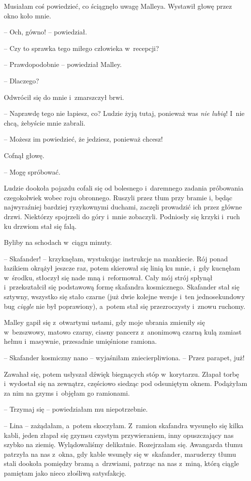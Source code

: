 \documentclass[oneside,polish,11pt,sfheadings]{mwbk}
\begin{document}
Musiałam coś powiedzieć, co ściągnęło uwagę Malleya. Wystawił głowę
przez okno koło mnie.

-- Och, gówno! -- powiedział.

-- Czy to sprawka tego miłego człowieka w~recepcji?

-- Prawdopodobnie -- powiedział Malley.

-- Dlaczego?

Odwrócił się do mnie i~zmarszczył brwi. 

-- Naprawdę tego nie łapiesz, co?
Ludzie żyją tutaj, ponieważ was \textit{nie lubią}! I~nie chcą, żebyście
mnie zabrali.

-- Możesz im powiedzieć, że jedziesz, ponieważ chcesz!

Cofnął głowę. 

-- Mogę spróbować.

Ludzie dookoła pojazdu cofali się od bolesnego i~daremnego zadania
próbowania czegokolwiek wobec roju obronnego. Ruszyli przez tłum przy
bramie i, będąc najwyraźniej bardziej ryzykownymi duchami, zaczęli
prowadzić ich przez główne drzwi. Niektórzy spojrzeli do góry i~mnie
zobaczyli. Podniosły się krzyki i~ruch ku drzwiom stał się falą.

Byliby na schodach w~ciągu minuty.

-- Skafander! -- krzyknęłam, wystukując instrukcje na mankiecie. Rój ponad
łazikiem okrążył jeszcze raz, potem skierował się linią ku mnie, i~gdy
kucnęłam w~środku, stłoczył się nade mną i~reformował. Cały mój strój
spłynął i~przekształcił się podstawową formę skafandra kosmicznego.
Skafander stał się sztywny, wszystko się stało czarne (już dwie kolejne
wersje i~ten jednosekundowy bug \textit{ciągle }nie był poprawiony), a~potem stał się przezroczysty i~znowu ruchomy.

Malley gapił się z~otwartymi ustami, gdy moje ubrania zmieniły się w~bezszwowy, matowo czarny, ciasny pancerz z~anonimową czarną kulą zamiast
hełmu i~masywnie, przesadnie umięśnione ramiona.

-- Skafander kosmiczny nano -- wyjaśniłam zniecierpliwiona. -- Przez
parapet, już!

Zawahał się, potem usłyszał dźwięk biegnących stóp w~korytarzu. Złapał
torbę i~wydostał się na zewnątrz, częściowo siedząc pod odsuniętym
oknem. Podążyłam za nim na gzyms i~objęłam go ramionami. 

-- Trzymaj się -- powiedziałam mu niepotrzebnie.

-- Lina -- zażądałam, a~potem skoczyłam. Z~ramion skafandra wysunęło się
kilka kabli, jeden złapał się gzymsu czystym przywieraniem, inny
opuszczający nas szybko na ziemię. Wylądowaliśmy delikatnie. Rozejrzałam
się. Awangarda tłumu patrzyła na nas z~okna, gdy kable wsunęły się w~skafander, maruderzy tłumu stali dookoła pomiędzy bramą a~drzwiami,
patrząc na nas z~miną, którą ciągle pamiętam jako nieco złośliwą
satysfakcję.
\end{document}
